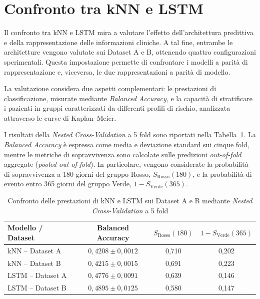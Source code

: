 \documentclass[a4paper,12pt]{report}
\begin{document}
\section{Confronto tra kNN e LSTM}
\label{sec:confronto_knn_lstm}

Il confronto tra kNN e LSTM mira a valutare l'effetto dell'architettura predittiva e della rappresentazione delle informazioni cliniche. A tal fine, entrambe le architetture vengono valutate sui Dataset A e B, ottenendo quattro configurazioni sperimentali. Questa impostazione permette di confrontare i modelli a parità di rappresentazione e, viceversa, le due rappresentazioni a parità di modello.

La valutazione considera due aspetti complementari: le prestazioni di classificazione, misurate mediante \textit{Balanced Accuracy}, e la capacità di stratificare i pazienti in gruppi caratterizzati da differenti profili di rischio, analizzata attraverso le curve di Kaplan--Meier.

I risultati della \textit{Nested Cross-Validation} a 5 fold sono riportati nella Tabella~\ref{tab:confronto_knn_lstm}. La \textit{Balanced Accuracy} è espressa come media e deviazione standard sui cinque fold, mentre le metriche di sopravvivenza sono calcolate sulle predizioni \textit{out-of-fold} aggregate (\textit{pooled out-of-fold}). In particolare, vengono considerate la probabilità di sopravvivenza a 180 giorni del gruppo Rosso, $S_{\text{Rosso}}(180)$, e la probabilità di evento entro 365 giorni del gruppo Verde, $1-S_{\text{Verde}}(365)$.

\begin{table}[H]
\centering
\small
\caption{Confronto delle prestazioni di kNN e LSTM sui Dataset A e B mediante \textit{Nested Cross-Validation} a 5 fold}
\label{tab:confronto_knn_lstm}
\begin{tabular}{lccc}
\toprule
\textbf{Modello / Dataset} & \textbf{Balanced Accuracy} & \textbf{$S_{\text{Rosso}}(180)$} & \textbf{$1-S_{\text{Verde}}(365)$} \\
\midrule
kNN -- Dataset A  & $0,4208 \pm 0,0012$ & 0,710 & 0,202 \\
kNN -- Dataset B  & $0,4215 \pm 0,0015$ & 0,691 & 0,223 \\
LSTM -- Dataset A & $0,4776 \pm 0,0091$ & 0,639 & 0,146 \\
LSTM -- Dataset B & $0,4895 \pm 0,0125$ & 0,580 & 0,147 \\
\bottomrule
\end{tabular}
\end{table}
\end{document}
